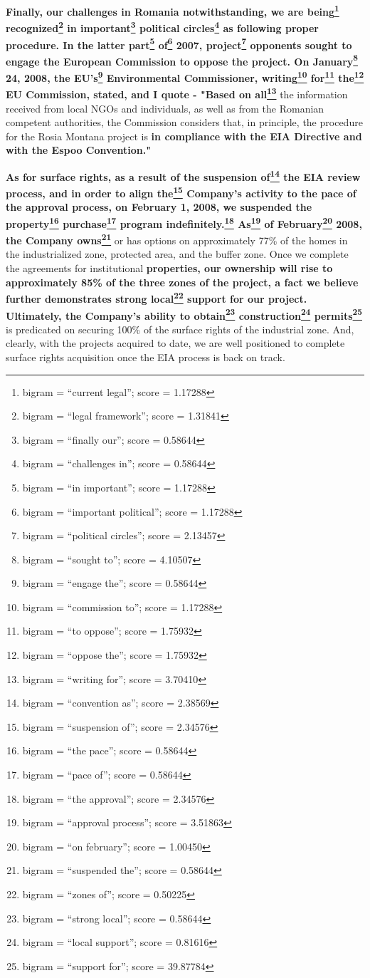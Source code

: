 \documentclass{article}
\begin{document}
 \textbf{Finally, our challenges in Romania notwithstanding, we are being\footnote{bigram = ``current legal''; score = 1.17288} recognized\footnote{bigram = ``legal framework''; score = 1.31841} in important\footnote{bigram = ``finally our''; score = 0.58644} political circles\footnote{bigram = ``challenges in''; score = 0.58644} as following proper procedure. In the latter part\footnote{bigram = ``in important''; score = 1.17288} of\footnote{bigram = ``important political''; score = 1.17288} 2007, project\footnote{bigram = ``political circles''; score = 2.13457} opponents sought to engage the European Commission to oppose the project. On January\footnote{bigram = ``sought to''; score = 4.10507} 24, 2008, the EU's\footnote{bigram = ``engage the''; score = 0.58644} Environmental Commissioner, writing\footnote{bigram = ``commission to''; score = 1.17288} for\footnote{bigram = ``to oppose''; score = 1.75932} the\footnote{bigram = ``oppose the''; score = 1.75932} EU Commission, stated, and I quote - "Based on all\footnote{bigram = ``writing for''; score = 3.70410}} the information received from local NGOs and individuals, as well as from the Romanian competent authorities, the Commission considers that, in principle, the procedure for the Rosia Montana project is \textbf{in compliance with the EIA Directive and with the Espoo Convention."} 

 \textbf{As for surface rights, as a result of the suspension of\footnote{bigram = ``convention as''; score = 2.38569} the EIA review process, and in order to align the\footnote{bigram = ``suspension of''; score = 2.34576} Company's activity to the pace of the approval process, on February 1, 2008, we suspended the property\footnote{bigram = ``the pace''; score = 0.58644} purchase\footnote{bigram = ``pace of''; score = 0.58644} program indefinitely.\footnote{bigram = ``the approval''; score = 2.34576} As\footnote{bigram = ``approval process''; score = 3.51863} of February\footnote{bigram = ``on february''; score = 1.00450} 2008, the Company owns\footnote{bigram = ``suspended the''; score = 0.58644}} or has options on approximately 77\% of the homes in the industrialized zone, protected area, and the buffer zone. Once we complete the agreements for institutional \textbf{properties, our ownership will rise to approximately 85\% of the three zones of the project, a fact we believe further demonstrates strong local\footnote{bigram = ``zones of''; score = 0.50225} support for our project. Ultimately, the Company's ability to obtain\footnote{bigram = ``strong local''; score = 0.58644} construction\footnote{bigram = ``local support''; score = 0.81616} permits\footnote{bigram = ``support for''; score = 39.87784}} is predicated on securing 100\% of the surface rights of the industrial zone. And, clearly, with the projects acquired to date, we are well positioned to complete surface rights acquisition once the EIA process is back on track. 
\end{document}

